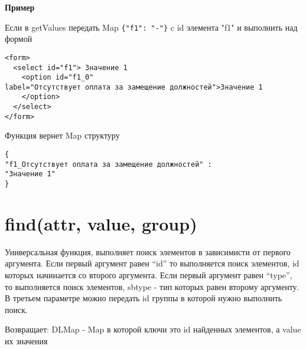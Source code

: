 \textbf{Пример}

Если в getValues передать Map \verb|{"f1": "-"}| c id элемента "f1" и выполнить над формой

\begin{verbatim}
<form>
  <select id="f1"> Значение 1
    <option id="f1_0"
label="Отсутствует оплата за замещение должностей">Значение 1
    </option>
  </select>
</form>
\end{verbatim}

Функция вернет Map структуру
\begin{verbatim}
{
"f1_Отсутствует оплата за замещение должностей" :
"Значение 1"
}
\end{verbatim}

\hypertarget{findattr-value-group-dlmap}{%
\section{find(attr, value, group)}\label{findattr-value-group-dlmap}}

Универсальная функция, выполняет поиск элементов в зависимисти от
первого аргумента. Если первый аргумент равен ``id'' то выполняется
поиск элементов, id которых начинается со второго аргумента. Если первый
аргумент равен ``type'', то выполняется поиск элементов, sbtype - тип
которых равен второму аргументу. В третьем параметре можно передать id
группы в которой нужно выполнить поиск.

Возвращает: DLMap - Map в которой ключи это id найденных
элементов, а value их значения\\


